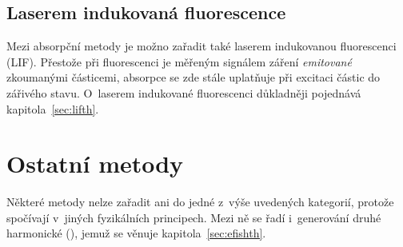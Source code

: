 \subsection{Laserem indukovaná fluorescence}
\label{sec:diagnostics-lif}
Mezi absorpční metody je možno zařadit také laserem indukovanou fluorescenci
(LIF).
Přestože při fluorescenci je měřeným signálem záření \emph{emitované}
zkoumanými částicemi, absorpce se zde stále uplatňuje při excitaci částic
do zářivého stavu.
O~laserem indukované fluorescenci důkladněji pojednává
kapitola~\ref{sec:lifth}.

%

\section{Ostatní metody}
\label{sec:diagnostics-misc}
Některé metody nelze zařadit ani do jedné z~výše uvedených kategorií,
protože spočívají v~jiných fyzikálních principech.
Mezi ně se řadí i~generování druhé harmonické (\EFISH),
jemuž se věnuje kapitola~\ref{sec:efishth}.
